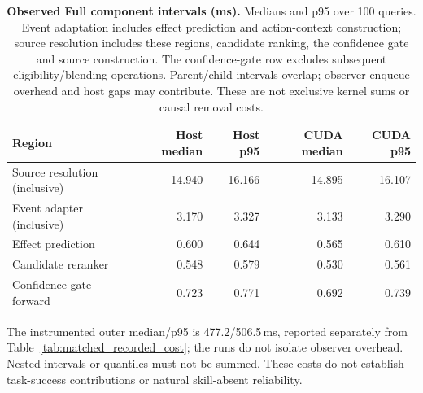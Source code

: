 \begin{table}[htbp]
\centering\small
\caption{\textbf{Observed Full component intervals (ms).} Medians and p95 over 100 queries. Event adaptation includes effect prediction and action-context construction; source resolution includes these regions, candidate ranking, the confidence gate and source construction. The confidence-gate row excludes subsequent eligibility/blending operations. Parent/child intervals overlap; observer enqueue overhead and host gaps may contribute. These are not exclusive kernel sums or causal removal costs.}
\label{tab:matched_module_intervals}
\begin{tabularx}{\linewidth}{@{}Xrrrr@{}}
\toprule
Region & Host median & Host p95 & CUDA median & CUDA p95 \\
\midrule
Source resolution (inclusive) & 14.940 & 16.166 & 14.895 & 16.107 \\
Event adapter (inclusive) & 3.170 & 3.327 & 3.133 & 3.290 \\
Effect prediction & 0.600 & 0.644 & 0.565 & 0.610 \\
Candidate reranker & 0.548 & 0.579 & 0.530 & 0.561 \\
Confidence-gate forward & 0.723 & 0.771 & 0.692 & 0.739 \\
\bottomrule
\end{tabularx}
\end{table}

The instrumented outer median/p95 is 477.2/506.5\,ms, reported separately from Table~\ref{tab:matched_recorded_cost}; the runs do not isolate observer overhead.
Nested intervals or quantiles must not be summed. These costs do not establish task-success contributions or natural skill-absent reliability.
